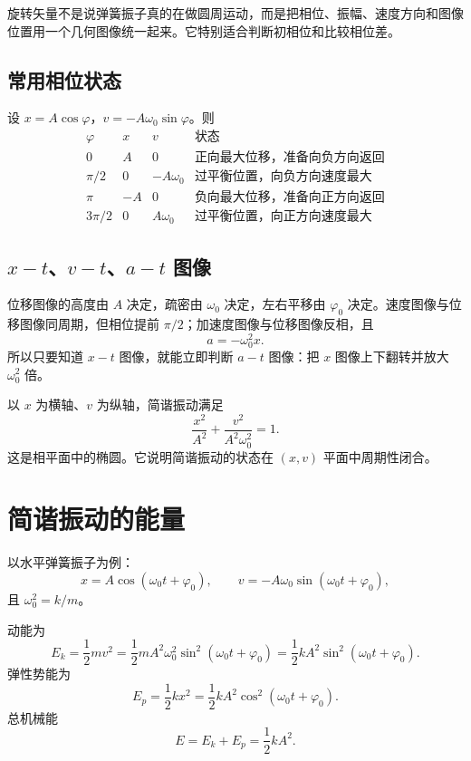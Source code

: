 \begin{attention}[旋转矢量只是描述方法]
旋转矢量不是说弹簧振子真的在做圆周运动，而是把相位、振幅、速度方向和图像位置用一个几何图像统一起来。它特别适合判断初相位和比较相位差。
\end{attention}

\subsection*{常用相位状态}

设 $x=A\cos\varphi$，$v=-A\omega_0\sin\varphi$。则
\[
\begin{array}{c|c|c|c}
\varphi & x & v & \text{状态}\\
\hline
0 & A & 0 & \text{正向最大位移，准备向负方向返回}\\
\pi/2 & 0 & -A\omega_0 & \text{过平衡位置，向负方向速度最大}\\
\pi & -A & 0 & \text{负向最大位移，准备向正方向返回}\\
3\pi/2 & 0 & A\omega_0 & \text{过平衡位置，向正方向速度最大}
\end{array}
\]

\subsection*{$x-t$、$v-t$、$a-t$ 图像}

位移图像的高度由 $A$ 决定，疏密由 $\omega_0$ 决定，左右平移由 $\varphi_0$ 决定。速度图像与位移图像同周期，但相位提前 $\pi/2$；加速度图像与位移图像反相，且
\[
  a=-\omega_0^2x.
\]
所以只要知道 $x-t$ 图像，就能立即判断 $a-t$ 图像：把 $x$ 图像上下翻转并放大 $\omega_0^2$ 倍。

\begin{definition}[相轨迹]\label{def:phase-trajectory}
以 $x$ 为横轴、$v$ 为纵轴，简谐振动满足
\[
  \frac{x^2}{A^2}+\frac{v^2}{A^2\omega_0^2}=1.
\]
这是相平面中的椭圆。它说明简谐振动的状态在 $(x,v)$ 平面中周期性闭合。
\end{definition}

\section{简谐振动的能量}

以水平弹簧振子为例：
\[
  x=A\cos(\omega_0t+\varphi_0),\qquad
  v=-A\omega_0\sin(\omega_0t+\varphi_0),
\]
且 $\omega_0^2=k/m$。

动能为
\[
  E_k=\frac12mv^2
  =\frac12mA^2\omega_0^2\sin^2(\omega_0t+\varphi_0)
  =\frac12kA^2\sin^2(\omega_0t+\varphi_0).
\]
弹性势能为
\[
  E_p=\frac12kx^2
  =\frac12kA^2\cos^2(\omega_0t+\varphi_0).
\]
总机械能
\[
  E=E_k+E_p=\frac12kA^2.
\]

